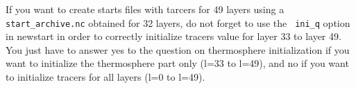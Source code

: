 If you want to create starts files with tarcers for 49 layers using a
{\tt start\_archive.nc} obtained for 32 layers, do not forget to use the
\verb+ ini_q+ option in newstart in order to correctly initialize tracers
value for layer 33 to layer 49.
You just have to answer yes to the question on thermosphere initialization
if you want to initialize the thermosphere part only (l=33 to l=49),
and no if you want to initialize tracers for all layers (l=0 to l=49).\\ \\

